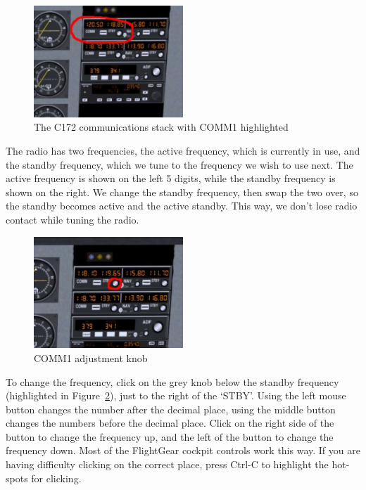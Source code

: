 \begin{figure}[!htp]
\centering
\includegraphics[width=0.5\textwidth]{comm1}
\caption{The C172 communications stack with COMM1 highlighted\label{comm1}}
\end{figure}

The radio has two frequencies, the active frequency, which is currently in use,
and the standby frequency, which we tune to the frequency we wish to use next.
The active frequency is shown on the left 5 digits, while the standby frequency
is shown on the right. We change the standby frequency, then swap the two over,
so the standby becomes active and the active standby. This way, we don't lose
radio contact while tuning the radio.

\begin{figure}[!htp]
\centering
\includegraphics[width=0.5\textwidth]{comm1_knob}
\caption{COMM1 adjustment knob\label{comm1knob}}
\end{figure}

To change the frequency, click on the grey knob below the standby frequency
(highlighted in Figure~\ref{comm1knob}), just to the right of the `STBY'.
Using the left mouse button changes the number after the decimal place,
using the middle button changes the numbers before the decimal place.
Click on the right side of the button to change the frequency up, and
the left of the button to change the frequency down. Most of the FlightGear
cockpit controls work this way. If you are having difficulty clicking on the
correct place, press Ctrl-C to highlight the hot-spots for clicking.

